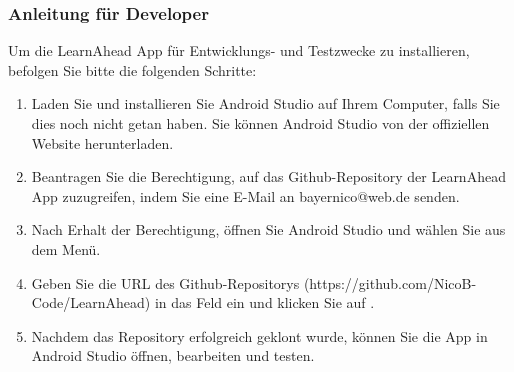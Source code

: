 \subsubsection{Anleitung für Developer}
Um die LearnAhead App für Entwicklungs- und Testzwecke zu installieren, befolgen Sie bitte die folgenden Schritte:\newline
\begin{enumerate}
    \item Laden Sie und installieren Sie Android Studio auf Ihrem Computer, falls Sie dies noch nicht getan haben. Sie können Android Studio von der offiziellen Website herunterladen.
    \item Beantragen Sie die Berechtigung, auf das Github-Repository der LearnAhead App zuzugreifen, indem Sie eine E-Mail an bayernico@web.de senden.
    \item Nach Erhalt der Berechtigung, öffnen Sie Android Studio und wählen Sie  aus dem  Menü.
    \item Geben Sie die URL des Github-Repositorys (https://github.com/NicoB-Code/LearnAhead) in das Feld  ein und klicken Sie auf .
    \item Nachdem das Repository erfolgreich geklont wurde, können Sie die App in Android Studio öffnen, bearbeiten und testen.
\end{enumerate}

